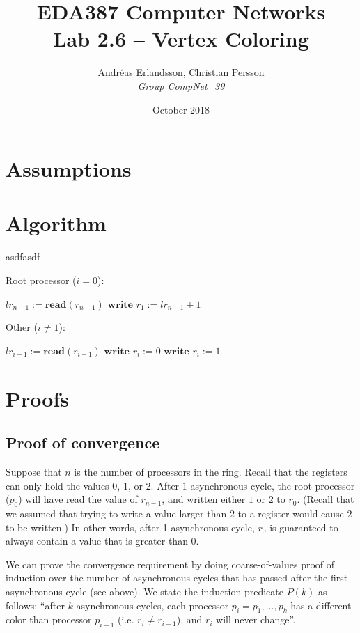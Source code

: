 \documentclass{article}
\title{EDA387 Computer Networks\\Lab 2.6 -- Vertex Coloring}
\author{Andréas Erlandsson, Christian Persson\\\it{Group CompNet\_39} }
\date{October 2018}
\begin{document}
\maketitle

\section*{Assumptions}

\section*{Algorithm}

\begin{algorithm}
    \caption{asdfasdf}
    Root processor ($i = 0$):
    \begin{algorithmic}[1]
            \State $lr_{n - 1} := \textbf{read}(r_{n - 1})$
            \State $\textbf{write } r_1 := lr_{n - 1} + 1$
        \EndWhile
    \end{algorithmic}
    Other ($i \neq 1$):
    \begin{algorithmic}[1]
            \State $lr_{i - 1} := \textbf{read}(r_{i - 1})$
                \State $\textbf{write } r_i := 0$
            \Else
                \State $\textbf{write } r_i := 1$
            \EndIf
        \EndWhile
    \end{algorithmic}
\end{algorithm}

\section*{Proofs}

\subsection*{Proof of convergence}
Suppose that $n$ is the number of processors in the ring. Recall that the registers can only hold the values $0$, $1$, or $2$. After $1$ asynchronous cycle, the root processor ($p_0$) will have read the value of $r_{n - 1}$, and written either $1$ or $2$ to $r_0$. (Recall that we assumed that trying to write a value larger than $2$ to a register would cause $2$ to be written.) In other words, after 1 asynchronous cycle, $r_0$ is guaranteed to always contain a value that is greater than $0$.

We can prove the convergence requirement by doing coarse-of-values proof of induction over the number of asynchronous cycles that has passed after the first asynchronous cycle (see above). We state the induction predicate $P(k)$ as follows: ``after $k$ asynchronous cycles, each processor $p_i = p_1, \ldots, p_k$ has a different color than processor $p_{i - 1}$ (i.e. $r_i \neq r_{i -1 }$), and $r_i$ will never change''.
\end{document}
